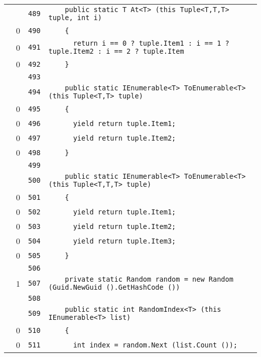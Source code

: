 \documentclass[a4paper,10pt]{article}
\begin{document}
\begin{longtable}[l]{lrrl}
\cellcolor{gray} &  & \verb~489~ & \verb~    public static T At<T> (this Tuple<T,T,T> tuple, int i)~\\
\cellcolor{red} & 0 & \verb~490~ & \verb~    {~\\
\cellcolor{red} & 0 & \verb~491~ & \verb~      return i == 0 ? tuple.Item1 : i == 1 ? tuple.Item2 : i == 2 ? tuple.Item~\\
\cellcolor{red} & 0 & \verb~492~ & \verb~    }~\\
\cellcolor{gray} &  & \verb~493~ & \verb~~\\
\cellcolor{gray} &  & \verb~494~ & \verb~    public static IEnumerable<T> ToEnumerable<T> (this Tuple<T,T> tuple)~\\
\cellcolor{red} & 0 & \verb~495~ & \verb~    {~\\
\cellcolor{red} & 0 & \verb~496~ & \verb~      yield return tuple.Item1;~\\
\cellcolor{red} & 0 & \verb~497~ & \verb~      yield return tuple.Item2;~\\
\cellcolor{red} & 0 & \verb~498~ & \verb~    }~\\
\cellcolor{gray} &  & \verb~499~ & \verb~~\\
\cellcolor{gray} &  & \verb~500~ & \verb~    public static IEnumerable<T> ToEnumerable<T> (this Tuple<T,T,T> tuple)~\\
\cellcolor{red} & 0 & \verb~501~ & \verb~    {~\\
\cellcolor{red} & 0 & \verb~502~ & \verb~      yield return tuple.Item1;~\\
\cellcolor{red} & 0 & \verb~503~ & \verb~      yield return tuple.Item2;~\\
\cellcolor{red} & 0 & \verb~504~ & \verb~      yield return tuple.Item3;~\\
\cellcolor{red} & 0 & \verb~505~ & \verb~    }~\\
\cellcolor{gray} &  & \verb~506~ & \verb~~\\
\cellcolor{green} & 1 & \verb~507~ & \verb~    private static Random random = new Random (Guid.NewGuid ().GetHashCode ())~\\
\cellcolor{gray} &  & \verb~508~ & \verb~~\\
\cellcolor{gray} &  & \verb~509~ & \verb~    public static int RandomIndex<T> (this IEnumerable<T> list)~\\
\cellcolor{red} & 0 & \verb~510~ & \verb~    {~\\
\cellcolor{red} & 0 & \verb~511~ & \verb~      int index = random.Next (list.Count ());~\\

\end{longtable}
\end{document}
